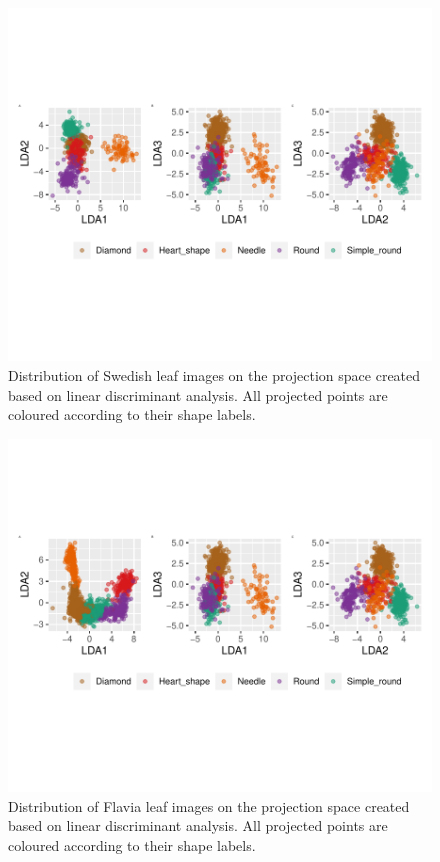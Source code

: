 \documentclass{article}
\begin{document}
\begin{figure}
\centering
\includegraphics{img/ldaswedish-1.pdf}
\caption{\label{ldaswedish}Distribution of Swedish leaf images on the
projection space created based on linear discriminant analysis. All
projected points are coloured according to their shape labels.}
\end{figure}

\begin{figure}
\centering
\includegraphics{img/ldaflavia-1.pdf}
\caption{\label{ldaflavia}Distribution of Flavia leaf images on the
projection space created based on linear discriminant analysis. All
projected points are coloured according to their shape labels.}
\end{figure}
\end{document}
